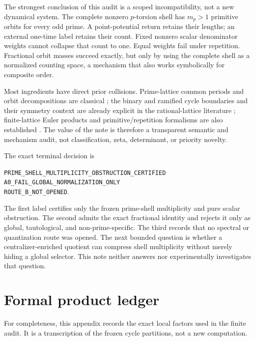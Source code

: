 \documentclass[11pt]{article}
\theoremstyle{definition}
\theoremstyle{remark}
\newcommand{\classification}{\texttt{PRIME\_SHELL\_MULTIPLICITY\_OBSTRUCTION\_CERTIFIED}}
\newcommand{\routea}{\texttt{A0\_FAIL\_GLOBAL\_NORMALIZATION\_ONLY}}
\newcommand{\routeb}{\texttt{ROUTE\_B\_NOT\_OPENED}}
\begin{document}
The strongest conclusion of this audit is a scoped incompatibility, not a
new dynamical system.  The complete nonzero \(p\)-torsion shell has
\(m_p>1\) primitive orbits for every odd prime.  A point-potential return
retains their lengths; an external one-time label retains their count.
Fixed nonzero scalar denominator weights cannot collapse that count to one.
Equal weights fail under repetition.  Fractional orbit masses succeed
exactly, but only by using the complete shell as a normalized counting
space, a mechanism that also works symbolically for composite order.

Most ingredients have direct prior collisions.  Prime-lattice common
periods and orbit decompositions are classical \citep{Gaspari1994}; the
binary and ramified cycle boundaries and their symmetry context are already
explicit in the rational-lattice literature
\citep{BaakeNeumaerkerRoberts2013}; finite-lattice Euler products and
primitive/repetition formalisms are also established
\citep{BaakeRobertsWeiss2008,ArtinMazur1965,Ruelle1976,
ParryPollicott1990}.  The value of the note is therefore a transparent
semantic and mechanism audit, not classification, zeta, determinant, or
priority novelty.

The exact terminal decision is
\begin{center}
\small
\classification\\[2pt]
\routea\\[2pt]
\routeb.
\end{center}
The first label certifies only the frozen prime-shell multiplicity and pure
scalar obstruction.  The second admits the exact fractional identity and
rejects it only as global, tautological, and non-prime-specific.  The third
records that no spectral or quantization route was opened.  The next bounded
question is whether a centralizer-enriched quotient can compress shell
multiplicity without merely hiding a global selector.  This note neither
answers nor experimentally investigates that question.

\appendix

\section{Formal product ledger}
\label{app:products}

For completeness, this appendix records the exact local factors used in the
finite audit.  It is a transcription of the frozen cycle partitions, not a
new computation.
\end{document}
